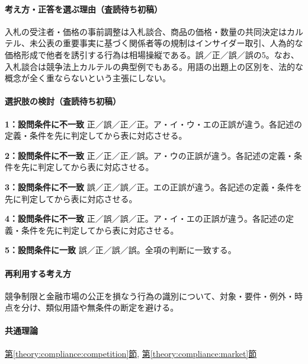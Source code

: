 \paragraph{考え方・正答を選ぶ理由（査読待ち初稿）} 入札の受注者・価格の事前調整は入札談合、商品の価格・数量の共同決定はカルテル、未公表の重要事実に基づく関係者等の規制はインサイダー取引、人為的な価格形成で他者を誘引する行為は相場操縦である。誤／正／誤／誤の5。なお、入札談合は競争法上カルテルの典型例でもある。用語の出題上の区別を、法的な概念が全く重ならないという主張にしない。

\paragraph{選択肢の検討（査読待ち初稿）}\mbox{}\par

\noindent\textbf{1：設問条件に不一致} 正／誤／正／正。ア・イ・ウ・エの正誤が違う。各記述の定義・条件を先に判定してから表に対応させる。\par

\noindent\textbf{2：設問条件に不一致} 正／正／正／誤。ア・ウの正誤が違う。各記述の定義・条件を先に判定してから表に対応させる。\par

\noindent\textbf{3：設問条件に不一致} 誤／正／誤／正。エの正誤が違う。各記述の定義・条件を先に判定してから表に対応させる。\par

\noindent\textbf{4：設問条件に不一致} 正／誤／誤／正。ア・イ・エの正誤が違う。各記述の定義・条件を先に判定してから表に対応させる。\par

\noindent\textbf{5：設問条件に一致} 誤／正／誤／誤。全項の判断に一致する。\par

\paragraph{再利用する考え方} 競争制限と金融市場の公正を損なう行為の識別について、対象・要件・例外・時点を分け、類似用語や無条件の断定を避ける。

\paragraph{共通理論} \hyperref[theory:compliance:competition]{第\ref*{theory:compliance:competition}節}, \hyperref[theory:compliance:market]{第\ref*{theory:compliance:market}節}

